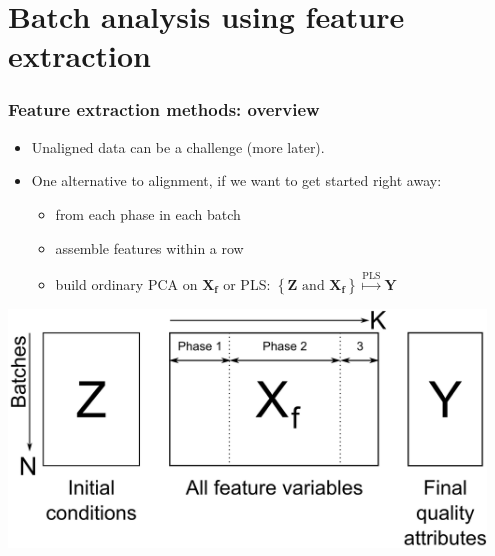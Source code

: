 \section{Batch analysis using feature extraction}

\begin{frame}\frametitle{Feature extraction methods: overview}

\begin{itemize}
	\item	Unaligned data can be a challenge (more later).
	
	\item	One alternative to alignment, if we want to get started right away: 
	
			\begin{itemize}
				\item	{} from each phase in each batch
				
				\item	assemble features within a row\pause
				
				\item	build ordinary PCA on \( \mathbf{X_f} \) or PLS: \( \left\{ \mathbf{Z} \,\,\text{and}\,\, \mathbf{X_f}\right\} \stackrel{\text{PLS}}{\longmapsto} \mathbf{Y} \)
			\end{itemize}
\end{itemize}

\begin{center}
	\includegraphics[width=0.95\textwidth]{images/data-after-feature-extraction.png}
\end{center}
\end{frame}

